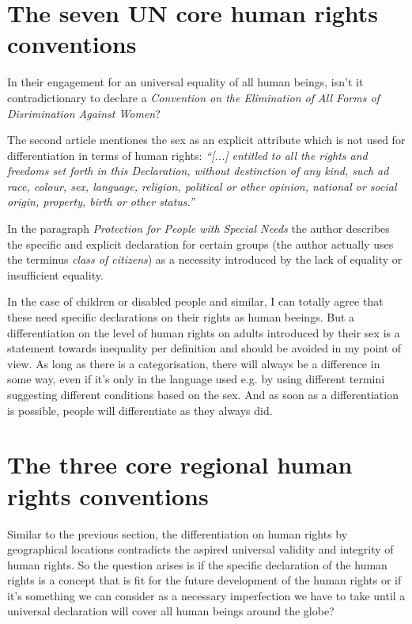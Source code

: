 \section{The seven UN core human rights conventions}
In their engagement for an universal equality of all human beings,
isn't it contradictionary to declare a \emph{Convention on the Elimination
of All Forms of Disrimination Against Women}?
\cite[p. 18]{tfohr}

The second article mentiones the sex as an explicit attribute which is not
used for differentiation in terms of human rights:\emph{
``[...] entitled to all the rights and freedoms set forth in this Declaration,
without destinction of any kind, such ad race, colour, sex, language, religion,
political or other opinion, national or social origin, property, birth or
other status.''}
\cite[p. 14]{tfohr}

In the paragraph \emph{Protection for People with Special Needs} the author
describes the specific and explicit declaration for certain groups (the author
actually uses the terminus \emph{class of citizens}) as a necessity introduced
by the lack of equality or insufficient equality.
\cite[. 29]{tfohr}

In the case of children or disabled people and similar, I can totally agree
that these need specific declarations on their rights as human beeings. But
a differentiation on the level of human rights on adults introduced by their
sex is a statement towards inequality per definition and should be avoided
in my point of view. As long as there is a categorisation, there will always
be a difference in some way, even if it's only in the language used e.g. by
using different termini suggesting different conditions based on the sex.
And as soon as a differentiation is possible, people will differentiate
as they always did.

\section{The three core regional human rights conventions}
Similar to the previous section, the differentiation on human rights by
geographical locations contradicts the aspired universal validity and integrity
of human rights. So the question arises is if the specific declaration of the
human rights is a concept that is fit for the future development of the human
rights or if it's something we can consider as a necessary imperfection we have
to take until a universal declaration will cover all human beings around the
globe?
\cite[p. 18]{tfohr}

